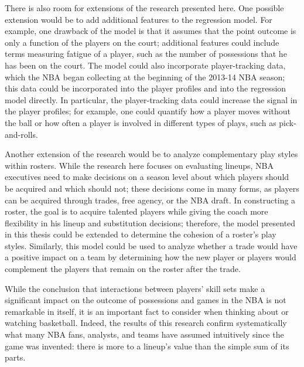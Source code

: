There is also room for extensions of the research presented here. One possible
extension would be to add additional features to the regression model. For example,
one drawback of the model is that it assumes that the point outcome is only a
function of the players on the court; additional features could include terms
measuring fatigue of a player, such as the number of possessions that he has been on
the court. The model could also incorporate player-tracking data, which the NBA
began collecting at the beginning of the 2013-14 NBA season; this data could be
incorporated into the player profiles and into the regression model directly. In
particular, the player-tracking data could increase the signal in the player
profiles; for example, one could quantify how a player moves without the ball or how
often a player is involved in different types of plays, such as pick-and-rolls.

Another extension of the research would be to analyze complementary play styles
within rosters. While the research here focuses on evaluating lineups, NBA
executives need to make decisions on a season level about which players should be
acquired and which should not; these decisions come in many forms, as players can be
acquired through trades, free agency, or the NBA draft. In constructing a roster,
the goal is to acquire talented players while giving the coach more flexibility in
his lineup and substitution decisions; therefore, the model presented in this thesis
could be extended to determine the cohesion of a roster's play styles. Similarly,
this model could be used to analyze whether a trade would have a positive impact on
a team by determining how the new player or players would complement the players
that remain on the roster after the trade.

While the conclusion that interactions between players' skill sets make a
significant impact on the outcome of possessions and games in the NBA is not
remarkable in itself, it is an important fact to consider when thinking about or
watching basketball. Indeed, the results of this research confirm systematically
what many NBA fans, analysts, and teams have assumed intuitively since the game was
invented: there is more to a lineup's value than the simple sum of its parts.
